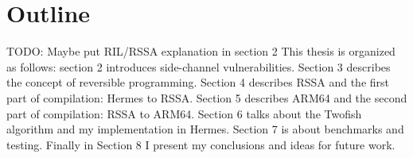 \section{Outline}
TODO: Maybe put RIL/RSSA explanation in section 2
This thesis is organized as follows: section 2 introduces side-channel vulnerabilities. Section 3 describes the concept of reversible programming. Section 4 describes RSSA and the first part of compilation: Hermes to RSSA. Section 5 describes ARM64 and the second part of compilation: RSSA to ARM64. Section 6 talks about the Twofish algorithm and my implementation in Hermes. Section 7 is about benchmarks and testing. Finally in Section 8 I present my conclusions and ideas for future work.
